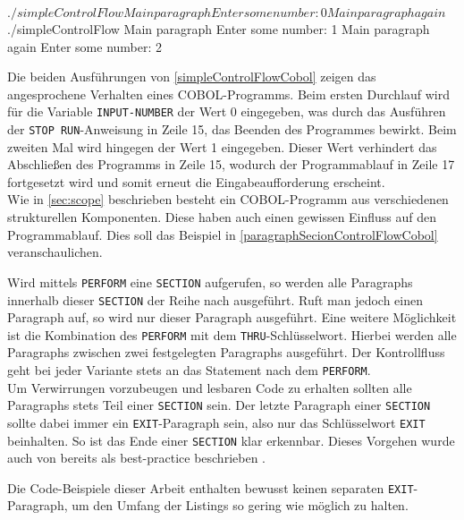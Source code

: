 \sepCodeAndOutputCheck
\begin{shellwindow}
$ ./simpleControlFlow 
Main paragraph
Enter some number: 0
Main paragraph again
$ ./simpleControlFlow 
Main paragraph
Enter some number: 1 
Main paragraph again
Enter some number: 2
\end{shellwindow}

Die beiden Ausführungen von \autoref{simpleControlFlowCobol} zeigen das angesprochene Verhalten eines COBOL-Programms. Beim ersten Durchlauf wird für die Variable \texttt{INPUT-NUMBER} der Wert 0 eingegeben, was durch das Ausführen der \texttt{STOP RUN}-Anweisung in Zeile 15, das Beenden des Programmes bewirkt. Beim zweiten Mal wird hingegen der Wert 1 eingegeben. Dieser Wert verhindert das Abschließen des Programms in Zeile 15, wodurch der Programmablauf in Zeile 17 fortgesetzt wird und somit erneut die Eingabeaufforderung erscheint.\\

Wie in \autoref{sec:scope} beschrieben besteht ein COBOL-Programm aus verschiedenen strukturellen Komponenten. Diese haben auch einen gewissen Einfluss auf den Programmablauf. Dies soll das Beispiel in \autoref{paragraphSecionControlFlowCobol} veranschaulichen.\\

\sepCodeAndOutputCheck
{}

Wird mittels \texttt{PERFORM} eine \texttt{SECTION} aufgerufen, so werden alle Paragraphs innerhalb dieser \texttt{SECTION} der Reihe nach ausgeführt. Ruft man jedoch einen Paragraph auf, so wird nur dieser Paragraph ausgeführt. Eine weitere Möglichkeit ist die Kombination des \texttt{PERFORM} mit dem \texttt{THRU}-Schlüsselwort. Hierbei werden alle Paragraphs zwischen zwei festgelegten Paragraphs ausgeführt. Der Kontrollfluss geht bei jeder Variante stets an das Statement nach dem \texttt{PERFORM}. \\

Um Verwirrungen vorzubeugen und lesbaren Code zu erhalten sollten alle Paragraphs stets Teil einer \texttt{SECTION} sein. Der letzte Paragraph einer \texttt{SECTION} sollte dabei immer ein \texttt{EXIT}-Paragraph sein, also nur das Schlüsselwort \texttt{EXIT} beinhalten. So ist das Ende einer \texttt{SECTION} klar erkennbar. Dieses Vorgehen wurde auch von \citeauthor{richards_enhancing_1984} bereits \citeyear{richards_enhancing_1984} als best-practice beschrieben  \cite{richards_enhancing_1984}.

Die Code-Beispiele dieser Arbeit enthalten bewusst keinen separaten \texttt{EXIT}-Paragraph, um den Umfang der Listings so gering wie möglich zu halten. 